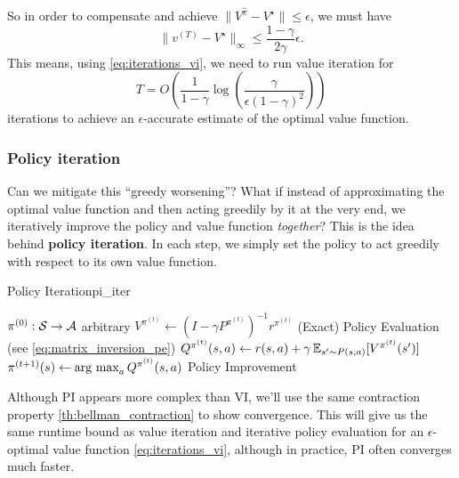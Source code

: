 \documentclass[../main/main]{subfiles}
\begin{document}
So in order to compensate and achieve $\|V^{\hat \pi} - V^{\star}\| \le \epsilon$, we must have
\[
    \|v^{(T)} - V^\star\|_{\infty} \le \frac{1-\gamma}{2 \gamma} \epsilon.
\]
This means, using \eqref{eq:iterations_vi}, we need to run value iteration for
\[
    T = O\left( \frac{1}{1-\gamma} \log\left(\frac{\gamma}{\epsilon (1-\gamma)^2}\right) \right)
\]
iterations to achieve an $\epsilon$-accurate estimate of the optimal value function.

\subsubsection{Policy iteration}

Can we mitigate this ``greedy worsening''? What if instead of approximating the optimal value function and then acting greedily by it at the very end, we iteratively improve the policy and value function \emph{together}? This is the idea behind \textbf{policy iteration}. In each step, we simply set the policy to act greedily with respect to its own value function.

\begin{definition}{Policy Iteration}{pi_iter}
\begin{algorithmic}
\State $\pi^{(0)} : \mathcal{S} \to \mathcal{A}$ arbitrary
    \State $V^{\pi^{(t)}} \gets (I - \gamma P^{\pi^{(t)}})^{-1} r^{\pi^{(t)}}$
    \Comment (Exact) Policy Evaluation (see \eqref{eq:matrix_inversion_pe})
    \State $Q^{\pi^{(t)}}(s, a) \gets r(s, a) + \gamma \operatorname*{\mathbb{E}}_{s' \sim P(s, a)} [V^{\pi^{(t)}} (s')]$
    \State $\pi^{(t+1)}(s) \gets \operatorname*{\textrm{arg\ max}}_a Q^{\pi^{(t)}} (s, a)$
    \Comment Policy Improvement
\EndFor
\end{algorithmic}
\end{definition}

Although PI appears more complex than VI, we'll use the same contraction property \eqref{th:bellman_contraction} to show convergence. This will give us the same runtime bound as value iteration and iterative policy evaluation for an $\epsilon$-optimal value function \eqref{eq:iterations_vi}, although in practice, PI often converges much faster.
\end{document}
